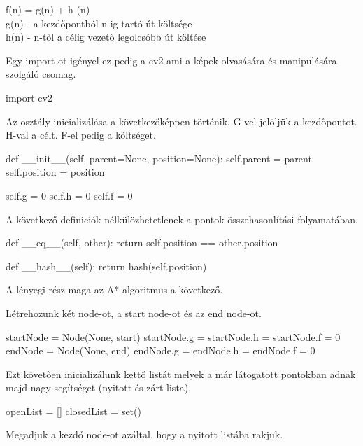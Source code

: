 f(n) = g(n) + h (n) \\
g(n) - a kezdőpontból n-ig tartó út költsége \\
h(n) - n-től a célig vezető legolcsóbb út költése 


Egy import-ot igényel ez pedig a cv2 ami a képek olvasására és manipulására szolgáló csomag.

\begin{python}
import cv2

\end{python}

Az osztály inicializálása a következőképpen történik. G-vel jelöljük a kezdőpontot. H-val a célt. F-el pedig a költséget.

\begin{python}
def __init__(self, parent=None, position=None):
    self.parent = parent
    self.position = position

    self.g = 0
    self.h = 0
    self.f = 0

\end{python}

A következő definiciók nélkülözhetetlenek a pontok összehasonlítási folyamatában.

\begin{python}
def __eq__(self, other):
        return self.position == other.position

def __hash__(self):
        return hash(self.position)

\end{python}

A lényegi rész maga az A* algoritmus a következő.

Létrehozunk két node-ot, a start node-ot és az end node-ot.

\begin{python}
startNode = Node(None, start)
startNode.g = startNode.h = startNode.f = 0
endNode = Node(None, end)
endNode.g = endNode.h = endNode.f = 0
\end{python}

Ezt követően inicializálunk kettő listát melyek a már látogatott pontokban adnak majd nagy segítséget (nyitott és zárt lista).

\begin{python}
openList = []
closedList = set()
\end{python}

Megadjuk a kezdő node-ot azáltal, hogy a nyitott listába rakjuk.


